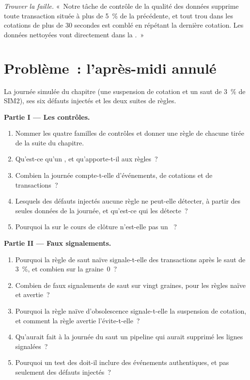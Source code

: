 \begin{exercise}[$\star\star\star$]\label{exo:pl:data-quality-and-lineage:8}
\emph{Trouver la faille.} «~Notre tâche de contrôle de la qualité des données supprime toute transaction située à plus de 5~\% de la précédente, et tout trou dans les cotations de plus de
30 secondes est comblé en répétant la dernière cotation. Les données nettoyées vont directement dans la .~»
\end{exercise}

\section{Problème~: l'après-midi annulé}

\begin{problem}\label{pb:pl:data-quality-and-lineage:1}
La journée simulée du chapitre (une suspension de cotation et un saut de 3~\% de SIM2), ses six défauts injectés et les deux suites de règles.

\medskip\noindent\textbf{Partie I --- Les contrôles.}
\begin{enumerate}
\item Nommer les quatre familles de contrôles et donner une règle de chacune tirée de la suite du chapitre.
\item Qu'est-ce qu'un , et qu'apporte-t-il aux règles~?
\item Combien la journée compte-t-elle d'événements, de cotations et de transactions~?
\item Lesquels des défauts injectés aucune règle ne peut-elle détecter, à partir des seules données de la journée, et qu'est-ce qui les détecte~?
\item Pourquoi la  sur le cours de clôture n'est-elle pas un ~?
\end{enumerate}

\medskip\noindent\textbf{Partie II --- Faux signalements.}
\begin{enumerate}[resume]
\item Pourquoi la règle de saut naïve signale-t-elle des transactions après le saut de 3~\%, et combien sur la graine~0~?
\item Combien de faux signalements de saut sur vingt graines, pour les règles naïve et avertie~?
\item Pourquoi la règle naïve d'obsolescence signale-t-elle la suspension de cotation, et comment la règle avertie l'évite-t-elle~?
\item Qu'aurait fait à la journée du saut un pipeline qui aurait supprimé les lignes signalées~?
\item Pourquoi un test des  doit-il inclure des événements authentiques, et pas seulement des défauts injectés~?
\end{enumerate}


\end{problem}
